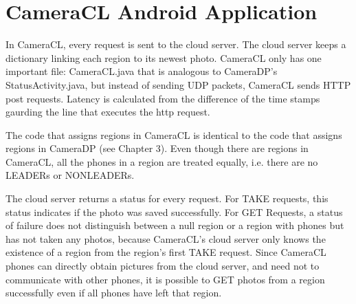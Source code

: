 \chapter{CameraCL Android Application}

In CameraCL, every request is sent to the cloud server. The cloud server keeps a dictionary linking each region to its newest photo.  CameraCL only has one important file: CameraCL.java that is analogous to CameraDP's StatusActivity.java, but instead of sending UDP packets, CameraCL sends HTTP post requests. Latency is calculated from the difference of the time stamps gaurding the line that executes the http request.

The code that assigns regions in CameraCL is identical to the code that assigns regions in CameraDP (see Chapter 3). Even though there are regions in CameraCL, all the phones in a region are treated equally, i.e. there are no LEADERs or NONLEADERs.

The cloud server returns a status for every request. For TAKE requests, this status indicates if the photo was saved successfully. For GET Requests, a status of failure does not distinguish between a null region or a region with phones but has not taken any photos, because CameraCL's cloud server only knows the existence of a region from the region's first TAKE request. Since CameraCL phones can directly obtain pictures from the cloud server, and need not to communicate with other phones, it is possible to GET photos from a region successfully even if all phones have left that region.